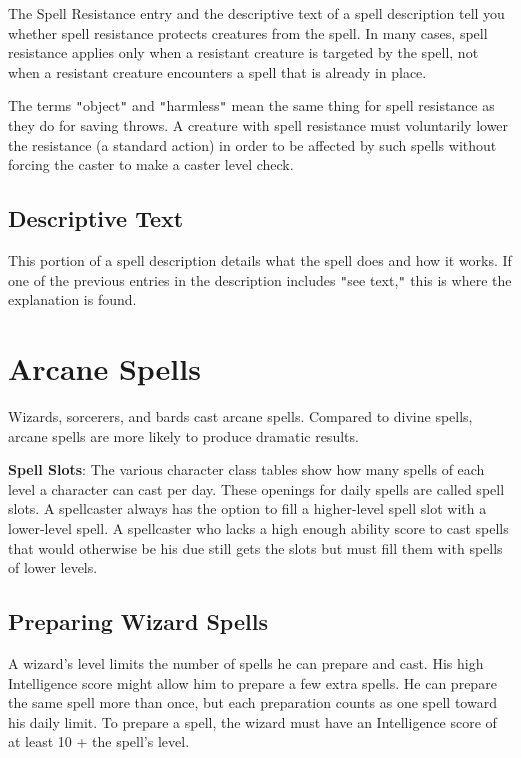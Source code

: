The Spell Resistance entry and the descriptive text of a spell description tell you whether spell resistance protects creatures from the spell. In many cases, spell resistance applies only when a resistant creature is targeted by the spell, not when a resistant creature encounters a spell that is already in place.
				
The terms \texttt{{}"{}}object\texttt{{}"{}} and \texttt{{}"{}}harmless\texttt{{}"{}} mean the same thing for spell resistance as they do for saving throws. A creature with spell resistance must voluntarily lower the resistance (a standard action) in order to be affected by such spells without forcing the caster to make a caster level check.
				
\subsection{Descriptive Text}

				
This portion of a spell description details what the spell does and how it works. If one of the previous entries in the description includes \texttt{{}"{}}see text,\texttt{{}"{}} this is where the explanation is found. 
				
\section{Arcane Spells}

				
Wizards, sorcerers, and bards cast arcane spells. Compared to divine spells, arcane spells are more likely to produce dramatic results.
				
\textbf{Spell Slots}: The various character class tables show how many spells of each level a character can cast per day. These openings for daily spells are called spell slots. A spellcaster always has the option to fill a higher-level spell slot with a lower-level spell. A spellcaster who lacks a high enough ability score to cast spells that would otherwise be his due still gets the slots but must fill them with spells of lower levels.
				
\subsection{Preparing Wizard Spells}

				
A wizard's level limits the number of spells he can prepare and cast. His high Intelligence score might allow him to prepare a few extra spells. He can prepare the same spell more than once, but each preparation counts as one spell toward his daily limit. To prepare a spell, the wizard must have an Intelligence score of at least 10 + the spell's level.
				
